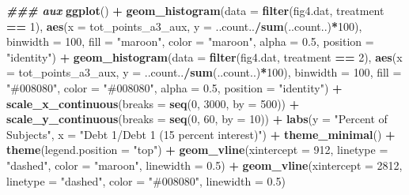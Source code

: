 \documentclass[
]{article}
\newenvironment{Shaded}{\begin{snugshade}}{\end{snugshade}}
\newcommand{\AttributeTok}[1]{\textcolor[rgb]{0.13,0.29,0.53}{#1}}
\newcommand{\DecValTok}[1]{\textcolor[rgb]{0.00,0.00,0.81}{#1}}
\newcommand{\DocumentationTok}[1]{\textcolor[rgb]{0.56,0.35,0.01}{\textbf{\textit{#1}}}}
\newcommand{\FloatTok}[1]{\textcolor[rgb]{0.00,0.00,0.81}{#1}}
\newcommand{\FunctionTok}[1]{\textcolor[rgb]{0.13,0.29,0.53}{\textbf{#1}}}
\newcommand{\NormalTok}[1]{#1}
\newcommand{\SpecialCharTok}[1]{\textcolor[rgb]{0.81,0.36,0.00}{\textbf{#1}}}
\newcommand{\StringTok}[1]{\textcolor[rgb]{0.31,0.60,0.02}{#1}}
\begin{document}
\begin{Shaded}
\begin{Highlighting}[]
\DocumentationTok{\#\#\# aux}
\FunctionTok{ggplot}\NormalTok{() }\SpecialCharTok{+}
  \FunctionTok{geom\_histogram}\NormalTok{(}\AttributeTok{data =} \FunctionTok{filter}\NormalTok{(fig4.dat, treatment }\SpecialCharTok{==} \DecValTok{1}\NormalTok{),}
                 \FunctionTok{aes}\NormalTok{(}\AttributeTok{x =}\NormalTok{ tot\_points\_a3\_aux, }\AttributeTok{y =}\NormalTok{ ..count..}\SpecialCharTok{/}\FunctionTok{sum}\NormalTok{(..count..)}\SpecialCharTok{*}\DecValTok{100}\NormalTok{),}
                 \AttributeTok{binwidth =} \DecValTok{100}\NormalTok{, }\AttributeTok{fill =} \StringTok{"maroon"}\NormalTok{, }\AttributeTok{color =} \StringTok{"maroon"}\NormalTok{, }\AttributeTok{alpha =} \FloatTok{0.5}\NormalTok{, }\AttributeTok{position =} \StringTok{"identity"}\NormalTok{) }\SpecialCharTok{+}
  \FunctionTok{geom\_histogram}\NormalTok{(}\AttributeTok{data =} \FunctionTok{filter}\NormalTok{(fig4.dat, treatment }\SpecialCharTok{==} \DecValTok{2}\NormalTok{),}
                 \FunctionTok{aes}\NormalTok{(}\AttributeTok{x =}\NormalTok{ tot\_points\_a3\_aux, }\AttributeTok{y =}\NormalTok{ ..count..}\SpecialCharTok{/}\FunctionTok{sum}\NormalTok{(..count..)}\SpecialCharTok{*}\DecValTok{100}\NormalTok{),}
                 \AttributeTok{binwidth =} \DecValTok{100}\NormalTok{, }\AttributeTok{fill =} \StringTok{"\#008080"}\NormalTok{, }\AttributeTok{color =} \StringTok{"\#008080"}\NormalTok{, }\AttributeTok{alpha =} \FloatTok{0.5}\NormalTok{, }\AttributeTok{position =} \StringTok{"identity"}\NormalTok{) }\SpecialCharTok{+}
  \FunctionTok{scale\_x\_continuous}\NormalTok{(}\AttributeTok{breaks =} \FunctionTok{seq}\NormalTok{(}\DecValTok{0}\NormalTok{, }\DecValTok{3000}\NormalTok{, }\AttributeTok{by =} \DecValTok{500}\NormalTok{)) }\SpecialCharTok{+}
  \FunctionTok{scale\_y\_continuous}\NormalTok{(}\AttributeTok{breaks =} \FunctionTok{seq}\NormalTok{(}\DecValTok{0}\NormalTok{, }\DecValTok{60}\NormalTok{, }\AttributeTok{by =} \DecValTok{10}\NormalTok{)) }\SpecialCharTok{+}
  \FunctionTok{labs}\NormalTok{(}\AttributeTok{y =} \StringTok{"Percent of Subjects"}\NormalTok{, }\AttributeTok{x =} \StringTok{"Debt 1/Debt 1 (15 percent interest)"}\NormalTok{) }\SpecialCharTok{+}
  \FunctionTok{theme\_minimal}\NormalTok{() }\SpecialCharTok{+}
  \FunctionTok{theme}\NormalTok{(}\AttributeTok{legend.position =} \StringTok{"top"}\NormalTok{) }\SpecialCharTok{+}
  \FunctionTok{geom\_vline}\NormalTok{(}\AttributeTok{xintercept =} \DecValTok{912}\NormalTok{, }\AttributeTok{linetype =} \StringTok{"dashed"}\NormalTok{, }\AttributeTok{color =} \StringTok{"maroon"}\NormalTok{, }\AttributeTok{linewidth =} \FloatTok{0.5}\NormalTok{) }\SpecialCharTok{+}
  \FunctionTok{geom\_vline}\NormalTok{(}\AttributeTok{xintercept =} \DecValTok{2812}\NormalTok{, }\AttributeTok{linetype =} \StringTok{"dashed"}\NormalTok{, }\AttributeTok{color =} \StringTok{"\#008080"}\NormalTok{, }\AttributeTok{linewidth =} \FloatTok{0.5}\NormalTok{)}
\end{Highlighting}
\end{Shaded}
\end{document}
